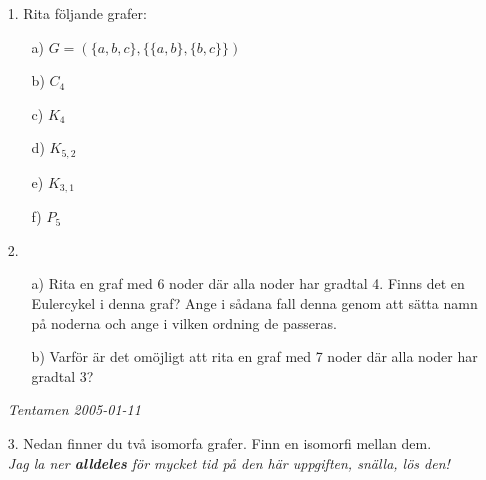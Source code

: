 \documentclass{article}
\begin{document}
\begin{enumerate}

\item[1.]
Rita följande grafer:
\begin{itemize}

\item[a)]
$G = ( \{ a,b,c \} , \{ \{ a,b \} , \{ b,c \} \} )$

\item[b)]
$C_{4}$

\item[c)]
$K_{4}$

\item[d)]
$K_{5,2}$

\item[e)]
$K_{3,1}$

\item[f)]
$P_{5}$

\end{itemize}
{\it }

\item[2.]
\begin{itemize}

\item[a)]
Rita en graf med 6 noder där alla noder har gradtal 4. Finns det en Eulercykel i 
denna graf? Ange i sådana fall denna genom att sätta namn på noderna och ange i 
vilken ordning de passeras.

\item[b)]
Varför är det omöjligt att rita en graf med 7 noder där alla noder har gradtal 3?
\end{itemize}
{\it Tentamen 2005-01-11}

\item[3.]
Nedan finner du två isomorfa grafer. Finn en isomorfi mellan dem.\\
{\it Jag la ner {\bf alldeles} för mycket tid på den här uppgiften, snälla, 
lös den!}
\usetikzlibrary{positioning}

\end{enumerate}
\end{document}
